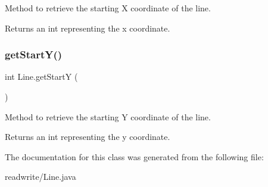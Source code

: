 Method to retrieve the starting X coordinate of the line. 

\begin{DoxyReturn}{Returns}
an int representing the x coordinate. 
\end{DoxyReturn}
\mbox{\label{class_line_a41eea486d4123a77525ea3b9e95c60af}} 
\subsubsection{\texorpdfstring{get\+Start\+Y()}{getStartY()}}
{\footnotesize\ttfamily int Line.\+get\+StartY (\begin{DoxyParamCaption}{ }\end{DoxyParamCaption})}



Method to retrieve the starting Y coordinate of the line. 

\begin{DoxyReturn}{Returns}
an int representing the y coordinate. 
\end{DoxyReturn}


The documentation for this class was generated from the following file\+:\begin{DoxyCompactItemize}
\item 
readwrite/Line.\+java\end{DoxyCompactItemize}
